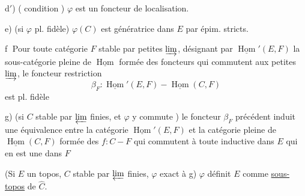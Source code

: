 d$'$)  ( condition ) $\varphi$ est un foncteur de localisation.

e) (si $\varphi$ pl. fidèle) $\varphi(C)$ est génératrice dans $E$ par épim. stricts.

\textcircled{f} Pour toute catégorie $F$ stable par petites $\varinjlim$, désignant par $\underline{\operatorname{Hom}}'(E,F)$ la sous-catégorie pleine de $\underline{\operatorname{Hom}}$ formée des foncteurs qui commutent aux petites $\varinjlim$, le foncteur restriction
\[
 \beta_F:\underline{\operatorname{Hom}}'(E,F)\mathbin{-}\underline{\operatorname{Hom}}(C,F)
\]
est pl. fidèle


g) (si $C$ stable par $\varprojlim$ finies, et $\varphi$ y commute ) le foncteur $\beta_F$ précédent induit une équivalence entre la catégorie $\underline{\operatorname{Hom}}'(E,F)$ et la  catégorie pleine de $\underline{\operatorname{Hom}}(C,F)$ formée des $f:C\mathbin{-}F$  qui commutent à toute  inductive dans $E$ qui en est une dans $F$


  (Si $E$ un topos, $C$ stable par $\varprojlim$ finies, $\varphi$ exact à g) $\varphi$ définit $E$ comme \uline{sous-topos} de $\widehat C$.
